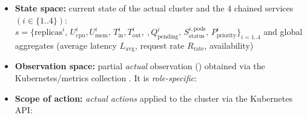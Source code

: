 \begin{itemize}

  \item \textbf{State space:} current state of the actual cluster and the 4 chained services \((i \in \{1..4\})\):
        \(
        s = \{\text{replicas}^i,\,
        U_{\text{cpu}}^i, U_{\text{mem}}^i,\,
        T_{\text{in}}^i, T_{\text{out}}^i,\ ,
        Q_{\text{pending}}^i,\,
        S_{\text{status}}^{i,\text{pods}},\,
        P_{\text{priority}}^i\}_{i=1..4}
        \)
        and global aggregates (average latency \(L_{\text{avg}}\), request rate \(R_{\text{rate}}\), availability)

  \item \textbf{Observation space:} partial \emph{actual} observation () obtained via the Kubernetes/metrics collection . It is \emph{role-specific}:

  \item \textbf{Scope of action:} \emph{actual actions} applied to the cluster via the Kubernetes API:


\end{itemize}
